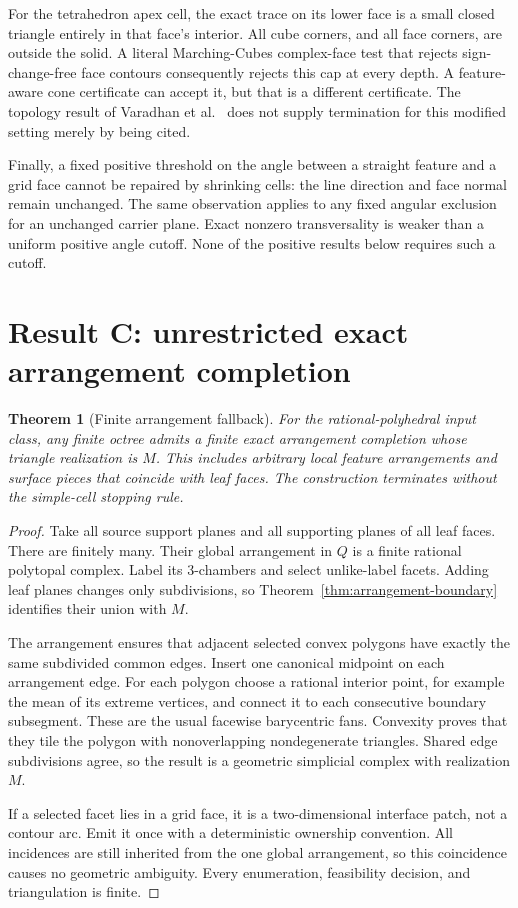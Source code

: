 \documentclass[11pt]{article}
\newtheorem{theorem}{Theorem}[section]
\theoremstyle{definition}
\theoremstyle{remark}
\begin{document}
For the tetrahedron apex cell, the exact trace on its lower face is a
small closed triangle entirely in that face's interior. All cube
corners, and all face corners, are outside the solid. A literal
Marching-Cubes complex-face test that rejects sign-change-free face
contours consequently rejects this cap at every depth. A feature-aware
cone certificate can accept it, but that is a different certificate.
The topology result of Varadhan et al.~\cite{varadhan} does not supply
termination for this modified setting merely by being cited.

Finally, a fixed positive threshold on the angle between a straight
feature and a grid face cannot be repaired by shrinking cells: the
line direction and face normal remain unchanged. The same observation
applies to any fixed angular exclusion for an unchanged carrier plane.
Exact nonzero transversality is weaker than a uniform positive angle
cutoff. None of the positive results below requires such a cutoff.

\section{Result C: unrestricted exact arrangement completion}
\label{sec:fallback}

\begin{theorem}[Finite arrangement fallback]
\label{thm:fallback}
For the rational-polyhedral input class, any finite octree admits a
finite exact arrangement completion whose triangle realization is $M$.
This includes arbitrary local feature arrangements and surface pieces
that coincide with leaf faces. The construction terminates without
the simple-cell stopping rule.
\end{theorem}

\begin{proof}
Take all source support planes and all supporting planes of all leaf
faces. There are finitely many. Their global arrangement in $Q$ is a
finite rational polytopal complex. Label its $3$-chambers and select
unlike-label facets. Adding leaf planes changes only subdivisions, so
Theorem~\ref{thm:arrangement-boundary} identifies their union with $M$.

The arrangement ensures that adjacent selected convex polygons have
exactly the same subdivided common edges. Insert one canonical midpoint
on each arrangement edge. For each polygon choose a rational interior
point, for example the mean of its extreme vertices, and connect it to
each consecutive boundary subsegment. These are the usual facewise
barycentric fans. Convexity proves that they tile the polygon with
nonoverlapping nondegenerate triangles. Shared edge subdivisions agree,
so the result is a geometric simplicial complex with realization $M$.

If a selected facet lies in a grid face, it is a two-dimensional
interface patch, not a contour arc. Emit it once with a deterministic
ownership convention. All incidences are still inherited from the one
global arrangement, so this coincidence causes no geometric ambiguity.
Every enumeration, feasibility decision, and triangulation is finite.
\end{proof}
\end{document}
